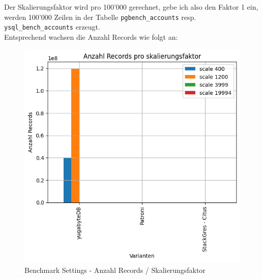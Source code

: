 \begin{flushleft}
    Der Skalierungsfaktor wird pro 100'000 gerechnet, gebe ich also den Faktor 1 ein, werden 100'000 Zeilen in der Tabelle \texttt{pgbench\_accounts} resp. \texttt{ysql\_bench\_accounts} erzeugt.\\
    Entsprechend wachsen die Anzahl Records wie folgt an:\\
    \begin{figure}[H]
        \centering
        \includegraphics[width=0.8\linewidth]{source/pandas_data_chart_plotter/row_counts}
        \caption{Benchmark Settings - Anzahl Records / Skalierungsfaktor}
        \label{fig:row_counts}
    \end{figure}
\end{flushleft}